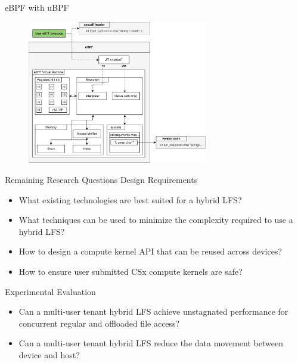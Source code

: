 \documentclass{beamer}
\begin{document}
% 
\begin{frame}{eBPF with uBPF}
	\begingroup
	\begin{figure}
		\centering
		\includegraphics[width=0.7\textwidth]{resources/images/ubpf-abi.pdf}
	\end{figure}
	\endgroup
\end{frame}

% 
\begin{frame}{Remaining Research Questions}
	\begingroup
	\small
	Design Requirements
	\begin{itemize}
		\item What existing technologies are best suited for a hybrid LFS?
		\item What techniques can be used to minimize the complexity required to
			  use a hybrid LFS?
		\item How to design a compute kernel API that can be reused across
			  devices?
		\item How to ensure user submitted CSx compute kernels are safe?
	\end{itemize}
	Experimental Evaluation
	\begin{itemize}
		\item Can a multi-user tenant hybrid LFS achieve unstagnated performance
			for concurrent regular and offloaded file access?
		\item Can a multi-user tenant hybrid LFS reduce the data movement
			between device and host?
	\end{itemize}
	\endgroup
\end{frame}
\end{document}
